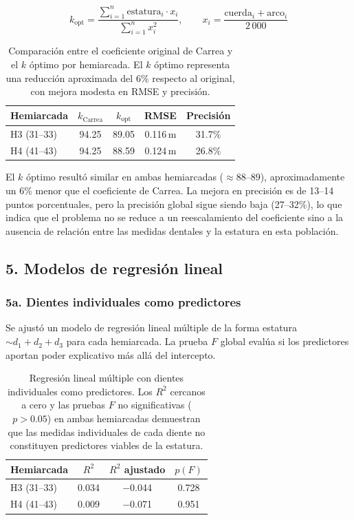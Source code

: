 \documentclass[11pt,letterpaper]{article}
\begin{document}
\begin{equation}
    k_{\text{opt}} = \frac{\displaystyle\sum_{i=1}^{n} \text{estatura}_i \cdot x_i}
                         {\displaystyle\sum_{i=1}^{n} x_i^2},
    \qquad
    x_i = \frac{\text{cuerda}_i + \text{arco}_i}{2\,000}
\end{equation}

\begin{table}[h!]
\centering
\begin{tabular}{lcccc}
\toprule
\textbf{Hemiarcada} & $k_{\text{Carrea}}$ & $k_{\text{opt}}$ & \textbf{RMSE} & \textbf{Precisión} \\
\midrule
H3 (31--33) & 94.25 & 89.05 & 0.116\,m & 31.7\% \\
H4 (41--43) & 94.25 & 88.59 & 0.124\,m & 26.8\% \\
\bottomrule
\end{tabular}
\caption{Comparación entre el coeficiente original de Carrea y el $k$ óptimo por hemiarcada. El $k$ óptimo representa una reducción aproximada del 6\% respecto al original, con mejora modesta en RMSE y precisión.}
\label{tab:k_optimo}
\end{table}

El $k$ óptimo resultó similar en ambas hemiarcadas ($\approx 88$--$89$), aproximadamente un 6\% menor que el coeficiente de Carrea. La mejora en precisión es de 13--14 puntos porcentuales, pero la precisión global sigue siendo baja (27--32\%), lo que indica que el problema no se reduce a un reescalamiento del coeficiente sino a la ausencia de relación entre las medidas dentales y la estatura en esta población.

\subsection*{5. Modelos de regresión lineal}

\subsubsection*{5a. Dientes individuales como predictores}

Se ajustó un modelo de regresión lineal múltiple de la forma estatura $\sim d_1 + d_2 + d_3$ para cada hemiarcada. La prueba $F$ global evalúa si los predictores aportan poder explicativo más allá del intercepto.

\begin{table}[h!]
\centering
\begin{tabular}{lccc}
\toprule
\textbf{Hemiarcada} & $R^2$ & $R^2$ ajustado & $p(F)$ \\
\midrule
H3 (31--33) & 0.034 & $-$0.044 & 0.728 \\
H4 (41--43) & 0.009 & $-$0.071 & 0.951 \\
\bottomrule
\end{tabular}
\caption{Regresión lineal múltiple con dientes individuales como predictores. Los $R^2$ cercanos a cero y las pruebas $F$ no significativas ($p > 0.05$) en ambas hemiarcadas demuestran que las medidas individuales de cada diente no constituyen predictores viables de la estatura.}
\label{tab:reg_dientes}
\end{table}
\end{document}
